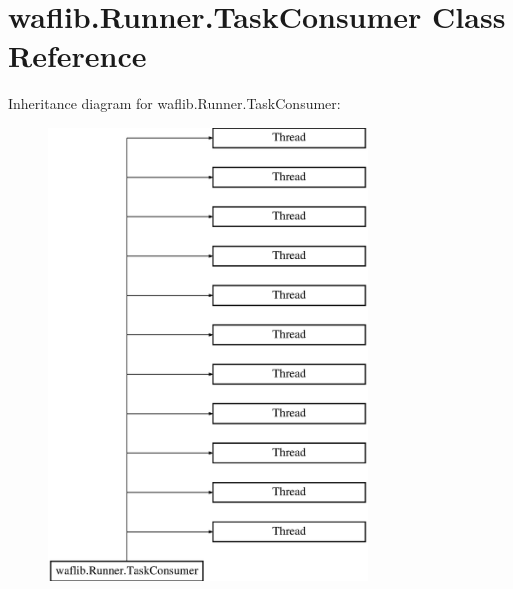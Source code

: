 \hypertarget{classwaflib_1_1_runner_1_1_task_consumer}{}\section{waflib.\+Runner.\+Task\+Consumer Class Reference}
\label{classwaflib_1_1_runner_1_1_task_consumer}
Inheritance diagram for waflib.\+Runner.\+Task\+Consumer\+:\begin{figure}[H]
\begin{center}
\leavevmode
\includegraphics[height=12.000000cm]{classwaflib_1_1_runner_1_1_task_consumer}
\end{center}
\end{figure}
